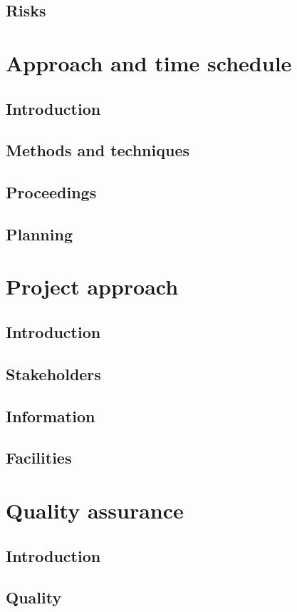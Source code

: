 \documentclass[]{article}
\begin{document}
\subsection{Risks}
\section{Approach and time schedule}
\subsection{Introduction}
\subsection{Methods and techniques}
\subsection{Proceedings}
\subsection{Planning}
\section{Project approach}
\subsection{Introduction}
\subsection{Stakeholders}
\subsection{Information}
\subsection{Facilities}
\section{Quality assurance}
\subsection{Introduction}
\subsection{Quality}

\newpage


\end{document}
